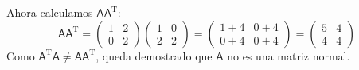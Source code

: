 \documentclass[11pt,spanish]{article}
\newcommand{\mat}[1]{\mathsf{#1}}
\begin{document}
\begin{itemize}
Ahora calculamos $\mat{A}\mat{A}^\text{T}$:
$$
\mat{A}\mat{A}^\text{T} = \begin{pmatrix} 1 & 2 \\ 0 & 2 \end{pmatrix} \begin{pmatrix} 1 & 0 \\ 2 & 2 \end{pmatrix} = \begin{pmatrix} 1+4 & 0+4 \\ 0+4 & 0+4 \end{pmatrix} = \begin{pmatrix} 5 & 4 \\ 4 & 4 \end{pmatrix}
$$
Como $\mat{A}^\text{T}\mat{A} \neq \mat{A}\mat{A}^\text{T}$, queda demostrado que $\mat{A}$ no es una matriz normal.
\end{itemize}
\end{document}
